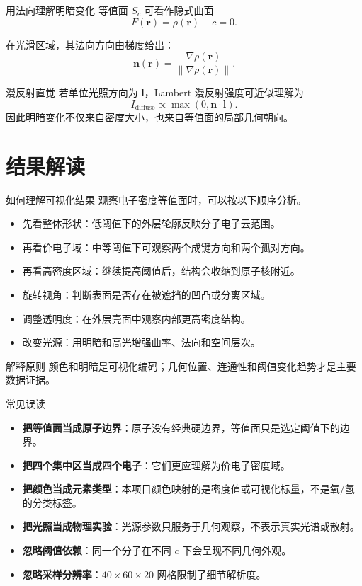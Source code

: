 \documentclass[aspectratio=169,11pt]{ctexbeamer}
\begin{document}
\begin{frame}{用法向理解明暗变化}
  等值面 $S_c$ 可看作隐式曲面
  \[
    F(\mathbf r)=\rho(\mathbf r)-c=0.
  \]

  在光滑区域，其法向方向由梯度给出：
  \[
    \mathbf n(\mathbf r)
    =
    \frac{\nabla \rho(\mathbf r)}
         {\|\nabla \rho(\mathbf r)\|}.
  \]

  \begin{block}{漫反射直觉}
    若单位光照方向为 $\mathbf l$，Lambert 漫反射强度可近似理解为
    \[
      I_{\mathrm{diffuse}}
      \propto
      \max(0,\mathbf n\cdot\mathbf l).
    \]
    因此明暗变化不仅来自密度大小，也来自等值面的局部几何朝向。
  \end{block}
\end{frame}

\section{结果解读}

\begin{frame}{如何理解可视化结果}
  观察电子密度等值面时，可以按以下顺序分析。

  \begin{itemize}
    \item 先看整体形状：低阈值下的外层轮廓反映分子电子云范围。
    \item 再看价电子域：中等阈值下可观察两个成键方向和两个孤对方向。
    \item 再看高密度区域：继续提高阈值后，结构会收缩到原子核附近。
    \item 旋转视角：判断表面是否存在被遮挡的凹凸或分离区域。
    \item 调整透明度：在外层壳面中观察内部更高密度结构。
    \item 改变光源：用明暗和高光增强曲率、法向和空间层次。
  \end{itemize}

  \begin{block}{解释原则}
    颜色和明暗是可视化编码；几何位置、连通性和阈值变化趋势才是主要数据证据。
  \end{block}
\end{frame}

\begin{frame}{常见误读}
  \begin{itemize}
    \item \textbf{把等值面当成原子边界}：原子没有经典硬边界，等值面只是选定阈值下的边界。
    \item \textbf{把四个集中区当成四个电子}：它们更应理解为价电子密度域。
    \item \textbf{把颜色当成元素类型}：本项目颜色映射的是密度值或可视化标量，不是氧/氢的分类标签。
    \item \textbf{把光照当成物理实验}：光源参数只服务于几何观察，不表示真实光谱或散射。
    \item \textbf{忽略阈值依赖}：同一个分子在不同 $c$ 下会呈现不同几何外观。
    \item \textbf{忽略采样分辨率}：$40\times60\times20$ 网格限制了细节解析度。
  \end{itemize}
\end{frame}
\end{document}
